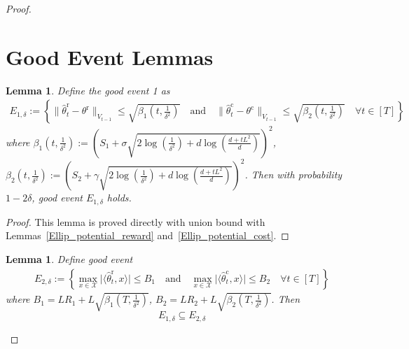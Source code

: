 \documentclass[accepted]{uai2025} %
\theoremstyle{plain}
\newtheorem{lemma}[theorem]{Lemma}
\theoremstyle{definition}
\theoremstyle{remark}
\newcommand{\thetac}{\theta^{\mathrm{c}}}
\newcommand{\thetar}{\theta^{\mathrm{r}}}
\newcommand{\hthetact}{\hat{\theta}_t^{\mathrm{c}}}
\newcommand{\hthetart}{\hat{\theta}_t^{\mathrm{r}}}
\newcommand{\cbr}[1]{\left\{#1\right\}}
\begin{document}
\begin{proof}
\section{Good Event Lemmas}
\label{sec:goodevents}
\begin{lemma}
    Define the good event 1 as
    \begin{align*}
        E_{1,\delta}:= \cbr{\lVert \hthetart-\thetar  \rVert_{V_{t-1}}\le \sqrt{\beta_1(t, \frac{1}{\delta^2})} \quad\text{and}\quad \lVert \hthetact-\thetac  \rVert_{V_{t-1}}\le \sqrt{\beta_2(t, \frac{1}{\delta^2}) }\quad\forall t\in[T]}
    \end{align*}
    where $\beta_1(t,\frac{1}{\delta^2}):= (S_1 + \sigma\sqrt{2 \log(\frac{1}{\delta^2}) + d \log\left(\frac{d + t L^2}{d}\right)})^2$, $\beta_2(t,\frac{1}{\delta^2}):= (S_2 + \gamma\sqrt{2 \log(\frac{1}{\delta^2}) + d \log\left(\frac{d + t L^2}{d}\right)})^2$.
    Then with probability $1-2\delta$, good event $E_{1,\delta}$ holds.
\end{lemma}
\begin{proof}
    This lemma is proved directly with union bound with Lemmas~\ref{Ellip_potential_reward} and~\ref{Ellip_potential_cost}.
\end{proof}
\begin{lemma}
Define good event
\begin{align*}
    E_{2,\delta}:= \cbr{\max_{x\in \mathcal{X}} \lvert \langle \hthetart, x\rangle\rvert \le B_{1} \quad\text{and}\quad \max_{x\in \mathcal{X}} \lvert \langle \hthetact, x\rangle\rvert \le B_{2} \quad \forall t\in[ T]}
\end{align*}
where $B_1= L R_1+L \sqrt{\beta_1(T, \frac{1}{\delta^2})}$, $B_2=L R_2+L \sqrt{\beta_2(T, \frac{1}{\delta^2})}$. 
Then $$E_{1,\delta}\subseteq E_{2,\delta}$$
\end{lemma}


\end{proof}
\end{document}
